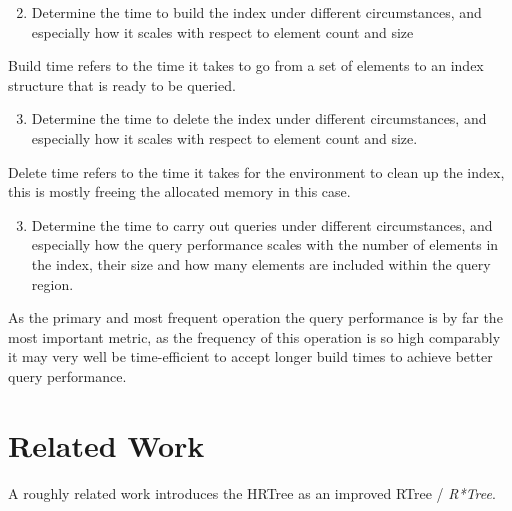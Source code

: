 \begin{enumerate}
    \setcounter{enumi}{1}
    \item Determine the time to build the index under different circumstances, and especially how it scales with respect to element count and size
\end{enumerate}
\begin{addmargin}[25pt]{0pt}
    Build time refers to the time it takes to go from a set of elements to an index structure that is ready to be queried.
\end{addmargin}

\begin{enumerate}
    \setcounter{enumi}{2}
    \item Determine the time to delete the index under different circumstances, and especially how it scales with respect to element count and size.
\end{enumerate}
\begin{addmargin}[25pt]{0pt}
    Delete time refers to the time it takes for the environment to clean up the index, this is mostly freeing the allocated memory in this case.
\end{addmargin}

\begin{enumerate}
    \setcounter{enumi}{2}
    \item Determine the time to carry out queries under different circumstances, and especially how the query performance scales with the number of elements in the index, their size and how many elements are included within the query region.
\end{enumerate}
\begin{addmargin}[25pt]{0pt}
    As the primary and most frequent operation the query performance is by far the most important metric, as the frequency of this operation is so high comparably it may very well be time-efficient to accept longer build times to achieve better query performance.
\end{addmargin}

\section{Related Work}


A roughly related work\cite{hprtree1999} introduces the \acs{HRTree} as an improved \acs{RTree} / \textit{R*Tree}.

